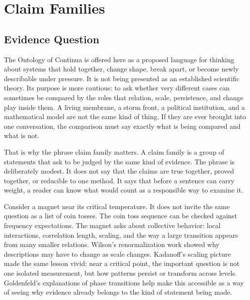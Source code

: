 \documentclass[11pt,a4paper,openany]{book}
\begin{document}
\section{Claim Families}
\subsection{Evidence Question}
The Ontology of Continua is offered here as a proposed language for thinking about systems that hold together, change shape, break apart, or become newly describable under pressure. It is not being presented as an established scientific theory. Its purpose is more cautious: to ask whether very different cases can sometimes be compared by the roles that relation, scale, persistence, and change play inside them. A living membrane, a storm front, a political institution, and a mathematical model are not the same kind of thing. If they are ever brought into one conversation, the comparison must say exactly what is being compared and what is not. \cite{grimmett_percolation,goldenfeld_lectures}\par
That is why the phrase claim family matters. A claim family is a group of statements that ask to be judged by the same kind of evidence. The phrase is deliberately modest. It does not say that the claims are true together, proved together, or reducible to one method. It says that before a sentence can carry weight, a reader can know what would count as a responsible way to examine it.\par
Consider a magnet near its critical temperature. It does not invite the same question as a list of coin tosses. The coin toss sequence can be checked against frequency expectations. The magnet asks about collective behavior: local interactions, correlation length, scaling, and the way a large transition appears from many smaller relations. Wilson's renormalization work showed why descriptions may have to change as scale changes. Kadanoff's scaling picture made the same lesson vivid: near a critical point, the important question is not one isolated measurement, but how patterns persist or transform across levels. Goldenfeld's explanations of phase transitions help make this accessible as a way of seeing why evidence already belongs to the kind of statement being made.\par
\end{document}
